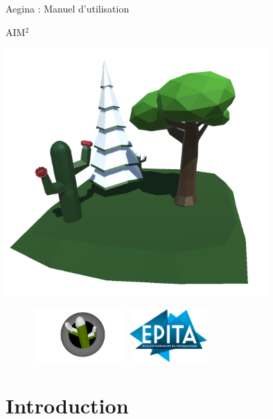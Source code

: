 \documentclass[12pt,a4paper]{article}
\begin{document}
\begin{titlepage}
\begin{center} 
\huge
Aegina : Manuel d'utilisation

AIM$^{2}$
\\
\vspace*{2em}
\large
\vspace{1em}

\vspace{2cm}
\includegraphics[width=10cm]{res/AeIcon.png}
\end{center} 
\begin{figure}[b]
\includegraphics[height=2cm]{res/logo.jpg}
\hspace{10cm}
\includegraphics[height=2cm]{res/logo-epita-hd.png}
\end{figure}
\end{titlepage}


\pagebreak

\tableofcontents

\pagebreak

\section{Introduction}
\end{document}

